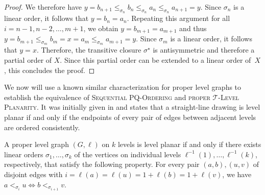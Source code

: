 \documentclass[runningheads]{llncs}
\newcommand{\pqprob}{\textsc{Sequential PQ-Or\-der\-ing}\xspace}
\newcommand{\tlp}{\textsc{proper $\mathcal T$-Level Planarity}\xspace}
\begin{document}
\begin{proof}
  We therefore have $y = b_{n+1} \leq_{\sigma_n} b_n \leq_{\sigma_n} a_n \leq_{\sigma_n} a_{n+1} = y$.
  Since $\sigma_n$ is a linear order, it follows that $y = b_n = a_n$.
  Repeating this argument for all $i = n-1,n-2,\dots,m+1$, we obtain $y = b_{m+1} = a_{m+1}$ and thus $y = b_{m+1} \leq_{\sigma_m} b_m = x = a_m \leq_{\sigma_m} a_{m+1} = y$.
  Since $\sigma_m$ is a linear order, it follows that $y = x$.
  Therefore, the transitive closure $\sigma^\star$ is antisymmetric and therefore a partial order of $X$.
  Since this partial order can be extended to a linear order of~$X$, this concludes the proof.
\end{proof} \fi


We now will use a known similar characterization for proper level graphs to establish the equivalence of \pqprob and \tlp.
It was initially given in \cite{rsb-asf-01} and states that a straight-line drawing is level planar if and only if the endpoints of every pair of edges between adjacent levels are ordered consistently.
\begin{lemma}
  \label{lem:levelPlanarEmbedding}
  A proper level graph $(G, \ell)$ on $k$ levels is level planar if and only if there exists linear orders $\sigma_1,\ldots,\sigma_k$ of the vertices on individual levels $\ell^{-1}(1),\ldots,\ell^{-1}(k)$, respectively, that satisfy the following property.
  For every pair $(a, b), (u, v)$ of disjoint edges with $i = \ell(a) = \ell(u) = 1 + \ell(b) = 1 + \ell(v)$, we have $a <_{\sigma_i} u \Leftrightarrow b <_{\sigma_{i+1}} v$.
\end{lemma}
\end{document}

